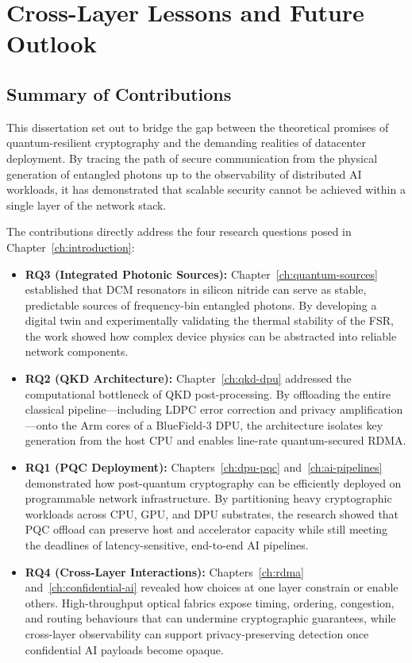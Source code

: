 \chapter{Cross-Layer Lessons and Future Outlook}
\label{ch:cross-layer}

\section{Summary of Contributions}

This dissertation set out to bridge the gap between the theoretical promises of quantum-resilient cryptography and the demanding realities of datacenter deployment. By tracing the path of secure communication from the physical generation of entangled photons up to the observability of distributed AI workloads, it has demonstrated that scalable security cannot be achieved within a single layer of the network stack.

The contributions directly address the four research questions posed in Chapter~\ref{ch:introduction}:
\begin{itemize}
    \item \textbf{RQ3 (Integrated Photonic Sources):} Chapter~\ref{ch:quantum-sources} established that DCM resonators in silicon nitride can serve as stable, predictable sources of frequency-bin entangled photons. By developing a digital twin and experimentally validating the thermal stability of the FSR, the work showed how complex device physics can be abstracted into reliable network components.
    \item \textbf{RQ2 (QKD Architecture):} Chapter~\ref{ch:qkd-dpu} addressed the computational bottleneck of QKD post-processing. By offloading the entire classical pipeline---including LDPC error correction and privacy amplification---onto the Arm cores of a BlueField-3 DPU, the architecture isolates key generation from the host CPU and enables line-rate quantum-secured RDMA.
    \item \textbf{RQ1 (PQC Deployment):} Chapters~\ref{ch:dpu-pqc} and~\ref{ch:ai-pipelines} demonstrated how post-quantum cryptography can be efficiently deployed on programmable network infrastructure. By partitioning heavy cryptographic workloads across CPU, GPU, and DPU substrates, the research showed that PQC offload can preserve host and accelerator capacity while still meeting the deadlines of latency-sensitive, end-to-end AI pipelines.
    \item \textbf{RQ4 (Cross-Layer Interactions):} Chapters~\ref{ch:rdma} and~\ref{ch:confidential-ai} revealed how choices at one layer constrain or enable others. High-throughput optical fabrics expose timing, ordering, congestion, and routing behaviours that can undermine cryptographic guarantees, while cross-layer observability can support privacy-preserving detection once confidential AI payloads become opaque.
\end{itemize}

